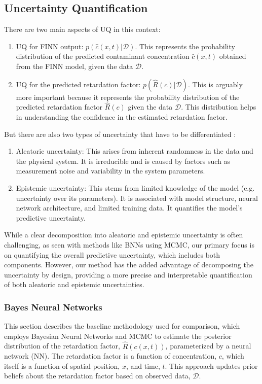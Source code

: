\subsection{Uncertainty Quantification}
There are two main aspects of UQ in this context:
\begin{enumerate}
    \item UQ for FINN output: $p(\hat{c}(x,t) | \mathcal{D})$. This represents the probability distribution of the predicted contaminant concentration $\hat{c}(x,t)$ obtained from the FINN model, given the data $\mathcal{D}$.
    \item UQ for the predicted retardation factor: $p(\hat{R}(c) | \mathcal{D})$. This is arguably more important because it represents the probability distribution of the predicted retardation factor $\hat{R}(c)$ given the data $\mathcal{D}$. This distribution helps in understanding the confidence in the estimated retardation factor.
\end{enumerate}

But there are also two types of uncertainty that have to be differentiated \cite{depeweg2018decomposition, gawlikowski2023survey}:

\begin{enumerate}
    \item Aleatoric uncertainty: This arises from inherent randomness in the data and the physical system. It is irreducible and is caused by factors such as measurement noise and variability in the system parameters.
    \item Epistemic uncertainty: This stems from limited knowledge of the model (e.g. uncertainty over its parameters). It is associated with model structure, neural network architecture, and limited training data. It quantifies the model's predictive uncertainty.
\end{enumerate}

While a clear decomposition into aleatoric and epistemic uncertainty is often challenging, as seen with methods like BNNs using MCMC, our primary focus is on quantifying the overall predictive uncertainty, which includes both components. However, our method has the added advantage of decomposing the uncertainty by design, providing a more precise and interpretable quantification of both aleatoric and epistemic uncertainties.





\subsubsection{Bayes Neural Networks}
\label{sec:bayes_nn}
This section describes the baseline methodology used for comparison, which employs Bayesian Neural Networks and MCMC to estimate the posterior distribution of the retardation factor, $\hat{R}(c(x,t))$, parameterized by a neural network (NN). The retardation factor is a function of concentration, $c$, which itself is a function of spatial position, $x$, and time, $t$. This approach updates prior beliefs about the retardation factor based on observed data, $\mathcal{D}$.

